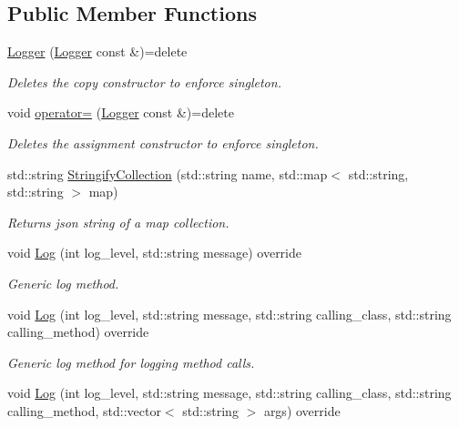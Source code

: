 \subsection*{Public Member Functions}
\begin{DoxyCompactItemize}
\item 
\mbox{\hyperlink{classcadg__rest_1_1_logger_a203a00818fd2c6c1f901759772e61e1d}{Logger}} (\mbox{\hyperlink{classcadg__rest_1_1_logger}{Logger}} const \&)=delete
\begin{DoxyCompactList}\small\item\em Deletes the copy constructor to enforce singleton. \end{DoxyCompactList}\item 
void \mbox{\hyperlink{classcadg__rest_1_1_logger_abf4a612be805b24b2e3c7e099fcbeee9}{operator=}} (\mbox{\hyperlink{classcadg__rest_1_1_logger}{Logger}} const \&)=delete
\begin{DoxyCompactList}\small\item\em Deletes the assignment constructor to enforce singleton. \end{DoxyCompactList}\item 
std\+::string \mbox{\hyperlink{classcadg__rest_1_1_logger_aa37e2e9bf03e22e3f34bb9da433df564}{Stringify\+Collection}} (std\+::string name, std\+::map$<$ std\+::string, std\+::string $>$ map)
\begin{DoxyCompactList}\small\item\em Returns json string of a map collection. \end{DoxyCompactList}\item 
void \mbox{\hyperlink{classcadg__rest_1_1_logger_a192e92e4e3137687bedbfd1157257e78}{Log}} (int log\+\_\+level, std\+::string message) override
\begin{DoxyCompactList}\small\item\em Generic log method. \end{DoxyCompactList}\item 
void \mbox{\hyperlink{classcadg__rest_1_1_logger_aaf6f54d98faa8124fbe7c08d7f3ab047}{Log}} (int log\+\_\+level, std\+::string message, std\+::string calling\+\_\+class, std\+::string calling\+\_\+method) override
\begin{DoxyCompactList}\small\item\em Generic log method for logging method calls. \end{DoxyCompactList}\item 
void \mbox{\hyperlink{classcadg__rest_1_1_logger_a136cd34db84495bd6e9c2ead927904d4}{Log}} (int log\+\_\+level, std\+::string message, std\+::string calling\+\_\+class, std\+::string calling\+\_\+method, std\+::vector$<$ std\+::string $>$ args) override

\end{DoxyCompactItemize}
